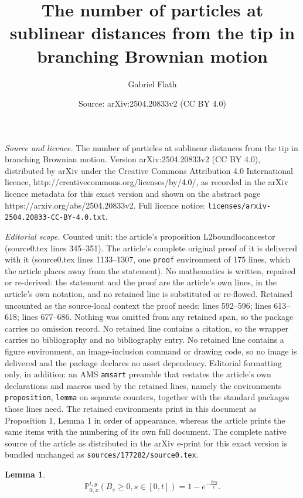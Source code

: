 \documentclass[10pt,a4paper]{amsart}
\title{The number of particles at sublinear distances from the tip in branching Brownian motion}
\author{Gabriel Flath}
\date{Source: arXiv:2504.20833v2 (CC BY 4.0)}
\newtheorem{lemma}{Lemma}
\newcommand{\Prob}{\mathbb{P}}
\begin{document}
\maketitle

\noindent\emph{Source and licence.} The number of particles at sublinear distances from the tip in branching Brownian motion. Version arXiv:2504.20833v2 (CC BY 4.0), distributed by arXiv under the Creative Commons Attribution 4.0 International licence, http://creativecommons.org/licenses/by/4.0/, as recorded in the arXiv licence metadata for this exact version and shown on the abstract page https://arxiv.org/abs/2504.20833v2. Full licence notice: \texttt{licenses/arxiv-2504.20833-CC-BY-4.0.txt}.\par\smallskip

\noindent\textit{Editorial scope.} Counted unit: the article's proposition L2boundlocancestor (source0.tex lines 345--351). The article's complete original proof of it is delivered with it (source0.tex lines 1133--1307, one \texttt{proof} environment of 175 lines, which the article places away from the statement). No mathematics is written, repaired or re-derived: the statement and the proof are the article's own lines, in the article's own notation, and no retained line is substituted or re-flowed.  Retained uncounted as the source-local context the proof needs: lines 592--596; lines 613--618; lines 677--686.  Nothing was omitted from any retained span, so the package carries no omission record.  No retained line contains a citation, so the wrapper carries no bibliography and no bibliography entry.  No retained line contains a figure environment, an image-inclusion command or drawing code, so no image is delivered and the package declares no asset dependency.  Editorial formatting only, in addition: an AMS \texttt{amsart} preamble that restates the article's own declarations and macros used by the retained lines, namely the environments \texttt{proposition}, \texttt{lemma} on separate counters, together with the standard packages those lines need.  The retained environments print in this document as Proposition 1, Lemma 1 in order of appearance, whereas the article prints the same items with the numbering of its own full document.  The complete native source of the article as distributed in the arXiv e-print for this exact version is bundled unchanged as \texttt{sources/177282/source0.tex}.
\begin{lemma}\label{bmbar}
\begin{equation}
    \Prob_{0,x}^{t,y}(B_s \geq 0 , s \in [0,t]) = 1 - e^{-\frac{2xy}{t}}.
\end{equation}
\end{lemma}
\end{document}

